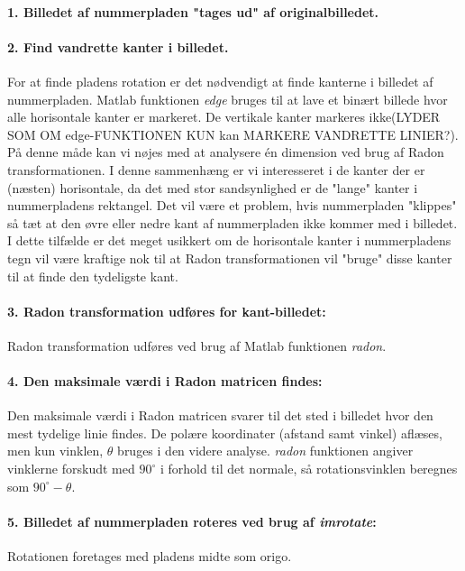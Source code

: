 \paragraph{1. Billedet af nummerpladen "tages ud" af originalbilledet.}
\paragraph{2. Find vandrette kanter i billedet.}
For at finde pladens rotation er det nødvendigt at finde kanterne i billedet af nummerpladen. Matlab funktionen \textit{edge} bruges til at lave et binært billede hvor alle horisontale kanter er markeret. De vertikale kanter markeres ikke(LYDER SOM OM edge-FUNKTIONEN KUN kan MARKERE VANDRETTE LINIER?). På denne måde kan vi nøjes med at analysere én dimension ved brug af Radon transformationen. I denne sammenhæng er vi interesseret i de kanter der er (næsten) horisontale, da det med stor sandsynlighed er de "lange" kanter i nummerpladens rektangel. Det vil være et problem, hvis nummerpladen "klippes" så tæt at den øvre eller nedre kant af nummerpladen ikke kommer med i billedet. I dette tilfælde er det meget usikkert om de horisontale kanter i nummerpladens tegn vil være kraftige nok til at Radon transformationen vil "bruge" disse kanter til at finde den tydeligste kant.

\paragraph{3. Radon transformation udføres for kant-billedet:} Radon transformation udføres ved brug af Matlab funktionen \textit{radon}.

\paragraph{4. Den maksimale værdi i Radon matricen findes:} Den maksimale værdi i Radon matricen svarer til det sted i billedet hvor den mest tydelige linie findes. De polære koordinater (afstand samt vinkel) aflæses, men kun vinklen, $\theta$ bruges i den videre analyse. \textit{radon} funktionen angiver vinklerne forskudt med $90^{\circ}$ i forhold til det normale, så rotationsvinklen beregnes som $90^{\circ} - \theta$.

\paragraph{5. Billedet af nummerpladen roteres ved brug af \textit{imrotate}:} Rotationen foretages med pladens midte som origo.

